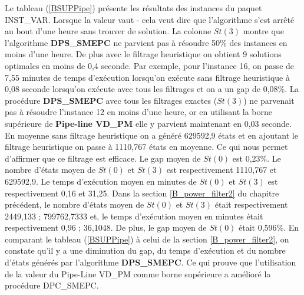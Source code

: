 Le tableau (\ref{BSUPPipe}) présente les résultats des instances du paquet INST\_VAR.  
Lorsque la valeur vaut \og - \fg{} cela veut dire que l'algorithme s'est arrêté au bout d'une heure sans trouver de solution.
   La colonne $St(3)$ montre que l'algorithme \textbf{DPS\_SMEPC} ne parvient pas à résoudre 50\% des instances en moins d'une heure. De plus avec le filtrage heuristique on obtient 9 solutions optimales en moins de 0,4 seconde.
Par exemple, pour l'instance 16, on passe de 7,55 minutes de temps d'exécution lorsqu'on exécute sans filtrage heuristique à 0,08 seconde lorsqu'on exécute avec tous les filtrages et on a un gap de 0,08\%. La procédure
 \textbf{DPS\_SMEPC} avec tous les filtrages exactes ($St(3)$) ne parvenait pas à résoudre l'instance 12 en moins d'une heure, or en utilisant la borne supérieure de \textbf{Pipe-line VD\_PM} elle y parvient maintenant en 0,03 seconde. En moyenne sans filtrage heuristique on a généré 629592,9 états et en ajoutant le filtrage heuristique on passe à 1110,767 états  en moyenne. Ce qui nous permet d'affirmer que ce filtrage est efficace.
 Le gap moyen de $St(0)$ est 
 0,23\%. 
 Le nombre d'états moyen de $St(0)$ et $St(3)$ est respectivement 
 1110,767 et 629592,9. 
 Le temps d'exécution moyen en minutes de $St(0)$ et $St(3)$ est respectivement 
 0,16 et 31,25. 
 Dans la section \ref{B_power_filter2} du chapitre précédent, le nombre d'états moyen de $St(0)$ et $St(3)$ était respectivement 2449,133 ; 799762,7333
 et, le temps d'exécution moyen en minutes était respectivement 0,96 ; 36,1048.
 De plus, le gap moyen de $St(0)$ était 0,596\%.
  En comparant le tableau (\ref{BSUPPipe}) à celui de la section \ref{B_power_filter2}, on constate qu'il y a une diminution du gap, du temps d'exécution et du nombre d'états générés par l'algorithme \textbf{DPS\_SMEPC}. Ce qui prouve que l'utilisation de la valeur du Pipe-Line VD\_PM comme borne supérieure a amélioré la procédure DPC\_SMEPC.
  
